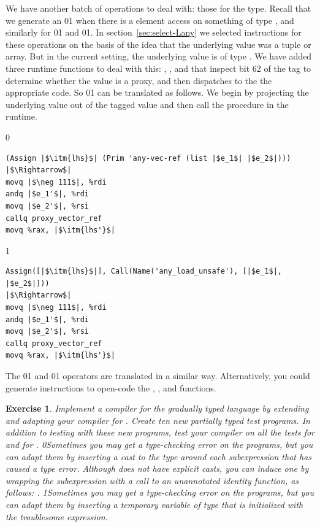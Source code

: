 \documentclass[7x10]{TimesAPriori_MIT}%
\def\racketEd{0}
\def\pythonEd{1}
\def\edition{1}
\newcommand{\racket}[1]{{\if\edition\racketEd{#1}\fi}}
\newcommand{\pythonColor}[0]{}
\newcommand{\python}[1]{{\if\edition\pythonEd\pythonColor #1\fi}}
\newtheorem{exercise}[theorem]{Exercise}
\numberwithin{theorem}{chapter}
\numberwithin{definition}{chapter}
\numberwithin{equation}{chapter}
\begin{document}
We have another batch of operations to deal with: those for the
\CANYTY{} type. Recall that we generate an
\racket{}\python{} when
there is a element access on something of type \CANYTY{}, and
similarly for
\racket{}\python{} and
\racket{}\python{}. In
section~\ref{sec:select-Lany} we selected instructions for these
operations on the basis of the idea that the underlying value was a tuple or
array. But in the current setting, the underlying value is of type
\PTUPLETYNAME{}\python{ or \PARRAYTYNAME{}}.  We have added three runtime
functions to deal with this:
,
, and
 that inspect bit $62$ of the tag
to determine whether the value is a proxy, and then
dispatches to the the appropriate code.
%
So \racket{}\python{}
can be translated as follows.
We begin by projecting the underlying value out of the tagged value and
then call the  procedure in the runtime.
{\if\edition\racketEd
\begin{lstlisting}
(Assign |$\itm{lhs}$| (Prim 'any-vec-ref (list |$e_1$| |$e_2$|)))
|$\Rightarrow$|
movq |$\neg 111$|, %rdi
andq |$e_1'$|, %rdi
movq |$e_2'$|, %rsi
callq proxy_vector_ref
movq %rax, |$\itm{lhs'}$|
\end{lstlisting}
\fi}
{\if\edition\pythonEd\pythonColor
\begin{lstlisting}
Assign([|$\itm{lhs}$|], Call(Name('any_load_unsafe'), [|$e_1$|, |$e_2$|]))
|$\Rightarrow$|
movq |$\neg 111$|, %rdi
andq |$e_1'$|, %rdi
movq |$e_2'$|, %rsi
callq proxy_vector_ref
movq %rax, |$\itm{lhs'}$|
\end{lstlisting}
\fi}
\noindent The \racket{}\python{}
and \racket{}\python{} operators 
are translated in a similar way. Alternatively, you could generate
instructions to open-code
the , ,
and  functions.

\begin{exercise}\normalfont\normalsize
  Implement a compiler for the gradually typed \LangGrad{} language by
  extending and adapting your compiler for \LangLam{}. Create ten new
  partially typed test programs. In addition to testing with these
  new programs, test your compiler on all the tests for \LangLam{}
  and for \LangDyn{}.
%
  \racket{Sometimes you may get a type-checking error on the
    \LangDyn{} programs, but you can adapt them by inserting a cast to
    the \CANYTY{} type around each subexpression that has caused a type
    error. Although \LangDyn{} does not have explicit casts, you can
    induce one by wrapping the subexpression \code{e} with a call to
    an unannotated identity function, as follows: \code{((lambda (x) x) e)}.}
%
  \python{Sometimes you may get a type-checking error on the
    \LangDyn{} programs, but you can adapt them by inserting a
    temporary variable of type \CANYTY{} that is initialized with the
    troublesome expression.}
\end{exercise}
\end{document}

